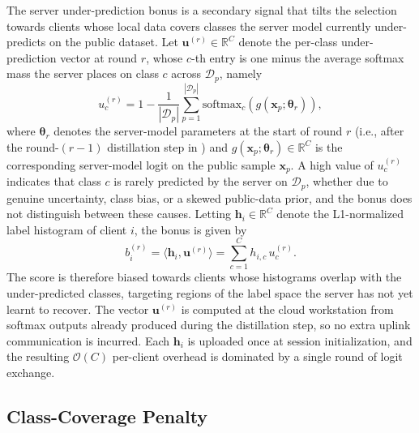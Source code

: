 \documentclass[journal]{IEEEtran}
\newcommand{\revIVE}[1]{#1}
\begin{document}
\revIVE{The server under-prediction bonus is a secondary signal that tilts the selection towards clients whose local data covers classes the server model currently under-predicts on the public dataset.} Let $\bm{u}^{(r)} \in \mathbb{R}^{C}$ denote the per-class under-prediction vector at round $r$, whose $c$-th entry is one minus the average softmax mass the server places on class $c$ across $\mathcal{D}_p$, namely
\begin{equation}
u_c^{(r)} = 1 - \frac{1}{|\mathcal{D}_p|}\sum_{p=1}^{|\mathcal{D}_p|} \mathrm{softmax}_c\!\left(g(\bm{x}_p; \bm{\theta}_r)\right),
\label{eq:uncert}
\end{equation}
where $\bm{\theta}_r$ denotes the server-model parameters at the start of round $r$ (i.e., after the round-$(r{-}1)$ distillation step in \cite[Algorithm~1]{mu2024fedtskd}) and $g(\bm{x}_p; \bm{\theta}_r) \in \mathbb{R}^{C}$ is the corresponding server-model logit on the public sample $\bm{x}_p$. \revIVE{A high value of $u_c^{(r)}$ indicates that class $c$ is rarely predicted by the server on $\mathcal{D}_p$, whether due to genuine uncertainty, class bias, or a skewed public-data prior, and the bonus does not distinguish between these causes.} Letting $\bm{h}_i \in \mathbb{R}^{C}$ denote the L1-normalized label histogram of client $i$, the bonus is given by
\begin{equation}
b_i^{(r)} = \langle \bm{h}_i, \bm{u}^{(r)} \rangle = \sum_{c=1}^{C} h_{i,c}\, u_c^{(r)}.
\label{eq:bonus}
\end{equation}
\revIVE{The score is therefore biased towards clients whose histograms overlap with the under-predicted classes, targeting regions of the label space the server has not yet learnt to recover. The vector $\bm{u}^{(r)}$ is computed at the cloud workstation from softmax outputs already produced during the distillation step, so no extra uplink communication is incurred. Each $\bm{h}_i$ is uploaded once at session initialization, and the resulting $\mathcal{O}(C)$ per-client overhead is dominated by a single round of logit exchange.}

\subsection{Class-Coverage Penalty}
\label{ssec:penalty-term}
\end{document}
